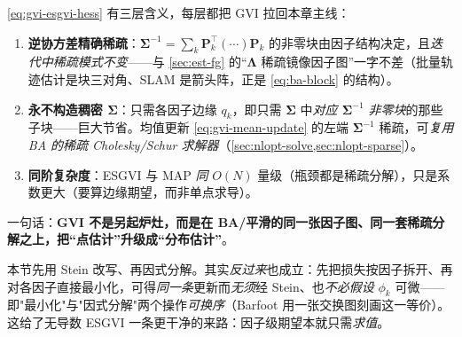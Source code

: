 \begin{insight}[ESGVI $=$ GVI 接回 BA 稀疏后端]
\cref{eq:gvi-esgvi-hess} 有三层含义，每层都把 GVI 拉回本章主线：
\begin{enumerate}
  \item \textbf{逆协方差精确稀疏}：$\boldsymbol{\Sigma}^{-1}=\sum_k\mathbf{P}_k^\top(\cdots)\mathbf{P}_k$ 的非零块由因子结构决定，且\emph{迭代中稀疏模式不变}——与 \cref{sec:est-fg} 的“$\boldsymbol{\Lambda}$ 稀疏镜像因子图”一字不差（批量轨迹估计是块三对角、SLAM 是箭头阵，正是 \cref{eq:ba-block} 的结构）。
  \item \textbf{永不构造稠密 $\boldsymbol{\Sigma}$}：只需各因子边缘 $q_k$，即只需 $\boldsymbol{\Sigma}$ 中\emph{对应 $\boldsymbol{\Sigma}^{-1}$ 非零块}的那些子块——巨大节省。均值更新 \cref{eq:gvi-mean-update} 的左端 $\boldsymbol{\Sigma}^{-1}$ 稀疏，可\emph{复用 BA 的稀疏 Cholesky/Schur 求解器}（\cref{sec:nlopt-solve,sec:nlopt-sparse}）。
  \item \textbf{同阶复杂度}：ESGVI 与 MAP \emph{同} $O(N)$ 量级（瓶颈都是稀疏分解），只是系数更大（要算边缘期望，而非单点求导）。
\end{enumerate}
一句话：\textbf{GVI 不是另起炉灶，而是在 BA/平滑的同一张因子图、同一套稀疏分解之上，把“点估计”升级成“分布估计”}。
\end{insight}

\begin{note}
本节先用 Stein 改写、再因式分解。其实\emph{反过来}也成立：先把损失按因子拆开、再对各因子直接最小化，可得\emph{同一条}更新而\emph{无须}经 Stein、也\emph{不必假设} $\phi_k$ 可微——即"最小化"与"因式分解"两个操作\emph{可换序}（Barfoot 用一张交换图刻画这一等价）。这给了无导数 ESGVI 一条更干净的来路：因子级期望本就只需\emph{求值}。
\end{note}

